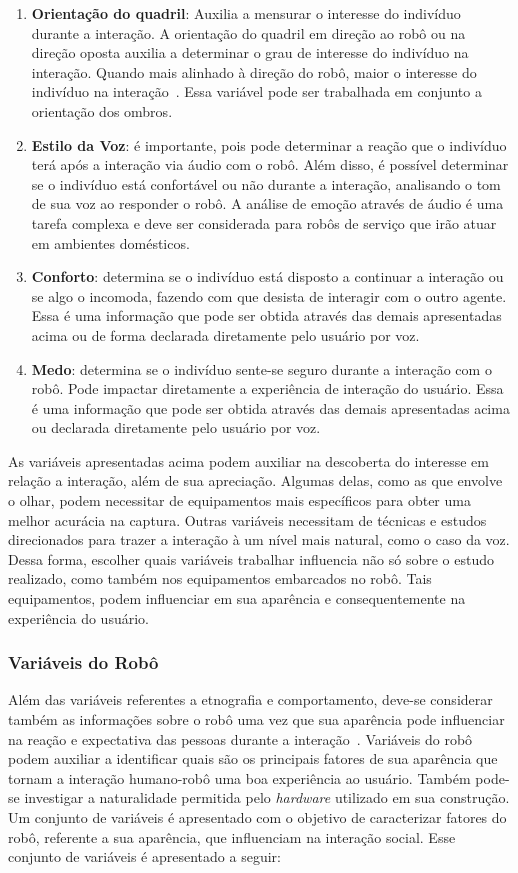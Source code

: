 \begin{enumerate}
    \item \textbf{Orientação do quadril}: Auxilia a mensurar o interesse do indivíduo durante a interação. A orientação do quadril em direção ao robô ou na direção oposta auxilia a determinar o grau de interesse do indivíduo na interação. Quando mais alinhado à direção do robô, maior o interesse do indivíduo na interação~\cite{lambert:2008}. Essa variável pode ser trabalhada em conjunto a orientação dos ombros.
    \item \textbf{Estilo da Voz}: é importante, pois pode determinar a reação que o indivíduo terá após a interação via áudio com o robô. Além disso, é possível determinar se o indivíduo está confortável ou não durante a interação, analisando o tom de sua voz ao responder o robô. A análise de emoção através de áudio é uma tarefa complexa e deve ser considerada para robôs de serviço que irão atuar em ambientes domésticos.
    \item \textbf{Conforto}: determina se o indivíduo está disposto a continuar a interação ou se algo o incomoda, fazendo com que desista de interagir com o outro agente. Essa é uma informação que pode ser obtida através das demais apresentadas acima ou de forma declarada diretamente pelo usuário por voz.
    \item \textbf{Medo}: determina se o indivíduo sente-se seguro durante a interação com o robô. Pode impactar diretamente a experiência de interação do usuário. Essa é uma informação que pode ser obtida através das demais apresentadas acima ou declarada diretamente pelo usuário por voz.
\end{enumerate}

As variáveis apresentadas acima podem auxiliar na descoberta do interesse em relação a interação, além de sua apreciação. Algumas delas, como as que envolve o olhar, podem necessitar de equipamentos mais específicos para obter uma melhor acurácia na captura. Outras variáveis necessitam de técnicas e estudos direcionados para trazer a interação à um nível mais natural, como o caso da voz. Dessa forma, escolher quais variáveis trabalhar influencia não só sobre o estudo realizado, como também nos equipamentos embarcados no robô. Tais equipamentos, podem influenciar em sua aparência e consequentemente na experiência do usuário.

\subsubsection{Variáveis do Robô}
\label{sec:variaveisrobo}
Além das variáveis referentes a etnografia e comportamento, deve-se considerar também as informações sobre o robô uma vez que sua aparência pode influenciar na reação e expectativa das pessoas durante a interação~\cite{hegel:2009}. Variáveis do robô podem auxiliar a identificar quais são os principais fatores de sua aparência que tornam a interação humano-robô uma boa experiência ao usuário. Também pode-se investigar a naturalidade permitida pelo \textit{hardware} utilizado em sua construção. Um conjunto de variáveis é apresentado com o objetivo de caracterizar fatores do robô, referente a sua aparência, que influenciam na interação social. Esse conjunto de variáveis é apresentado a seguir:

